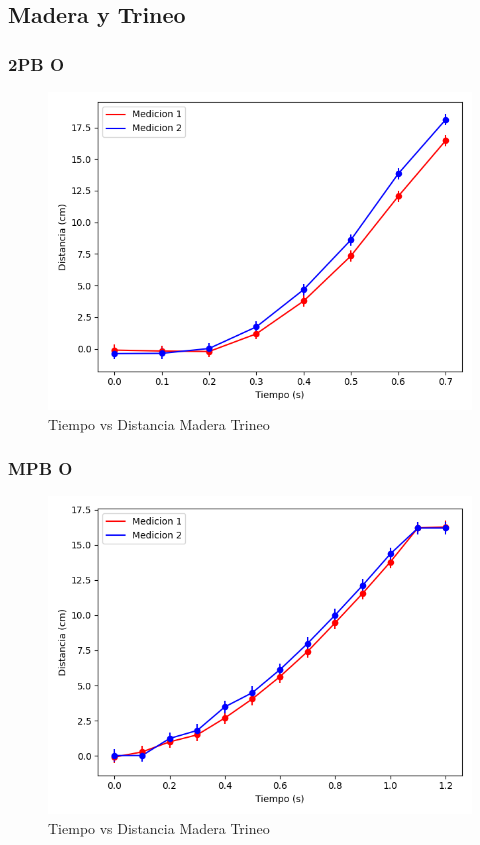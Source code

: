 \documentclass[12pt,a4]{article}
\begin{document}
\subsection{Madera y Trineo}

\subsubsection{2PB O}

\begin{figure}[H]
    \centering
    \includegraphics[width=0.9\linewidth]{TiempoVsDistanciaPisoMadera2PB_O.png}
    \caption{Tiempo vs Distancia Madera Trineo}
    \label{fig:TvD2PB_O piso trineo}

\end{figure}

\subsubsection{MPB O}

\begin{figure}[H]
    \centering
    \includegraphics[width=0.9\linewidth]{TiempoVsDistanciaPisoMaderaMPB_O.png}
    \caption{Tiempo vs Distancia Madera Trineo}
    \label{fig:TvDM_OP piso trineo}
\end{figure}
\end{document}
